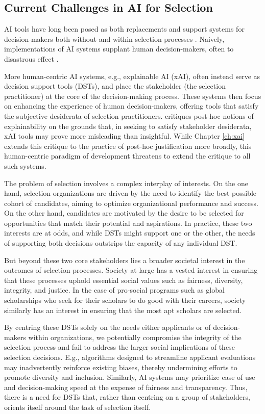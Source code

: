 \subsection{Current Challenges in AI for Selection}
AI tools have long been posed as both replacements and support systems for decision-makers both without and within selection processes \cite{barocas_big_2016,jacobs_how_2021,hildebrandt_law_nodate,yarger2020algorithmic,mattu_how_nodate}. Naively, implementations of AI systems supplant human decision-makers, often to disastrous effect \cite{mattu_how_nodate}.

More human-centric AI systems, e.g., explainable AI (xAI), often instead serve as decision support tools (DSTs), and place the stakeholder (the selection practitioner) at the core of the decision-making process. These systems then focus on enhancing the experience of human decision-makers, offering tools that satisfy the subjective desiderata of selection practitioners. \textcite{Lipton} critiques post-hoc notions of explainability on the grounds that, in seeking to satisfy stakeholder desiderata, xAI tools may prove more misleading than insightful. While Chapter \ref{ch:xai} extends this critique to the practice of post-hoc justification more broadly, this human-centric paradigm of development threatens to extend the critique to all such systems.

The problem of selection involves a complex interplay of interests. On the one hand, selection organizations are driven by the need to identify the best possible cohort of candidates, aiming to optimize organizational performance and success. On the other hand, candidates are motivated by the desire to be selected for opportunities that match their potential and aspirations. In practice, these two interests are at odds, and while DSTs might support one or the other, the needs of supporting both decisions outstrips the capacity of any individual DST. %

But beyond these two core stakeholders lies a broader societal interest in the outcomes of selection processes. Society at large has a vested interest in ensuring that these processes uphold essential social values such as fairness, diversity, integrity, and justice. In the case of pro-social programs such as global scholarships who seek for their scholars to do good with their careers, society similarly has an interest in ensuring that the most apt scholars are selected.

By centring these DSTs solely on the needs either applicants or of decision-makers within organizations, we potentially compromise the integrity of the selection process and fail to address the larger social implications of these selection decisions. E.g., algorithms designed to streamline applicant evaluations may inadvertently reinforce existing biases, thereby undermining efforts to promote diversity and inclusion. Similarly, AI systems may prioritize ease of use and decision-making speed at the expense of fairness and transparency. Thus, there is a need for DSTs that, rather than centring on a group of stakeholders, orients itself around the task of selection itself.

